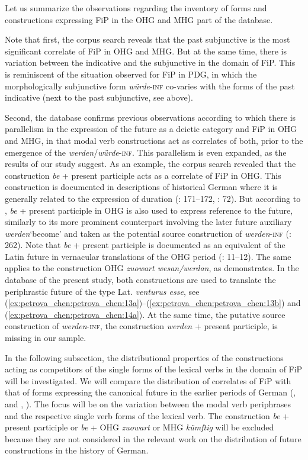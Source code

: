 \documentclass[output=paper,colorlinks,citecolor=brown]{langscibook}
\begin{document}
Let us summarize the observations regarding the inventory of forms and constructions expressing FiP in the OHG and MHG part of the database.

Note that first, the corpus search reveals that the past subjunctive is the most significant correlate of FiP in OHG and MHG. But at the same time, there is variation between the indicative and the subjunctive in the domain of FiP. This is reminiscent of the situation observed for FiP in PDG, in which the morphologically subjunctive form \textit{würde}-\textsc{inf} co-varies with the forms of the past indicative (next to the past subjunctive, see  above).

Second, the database confirms previous observations according to which there is parallelism in the expression of the future as a deictic category and FiP in OHG and MHG, in that modal verb constructions act as correlates of both, prior to the emergence of the \textit{werden}/\textit{würde}-\textsc{inf}. This parallelism is even expanded, as the results of our study suggest. As an example, the corpus search revealed that the construction \textit{be} + present participle acts as a correlate of FiP in OHG. This construction is documented in descriptions of historical German where it is generally related to the expression of duration (\cite{Wilmanns1906}: 171--172, \cite{Paul1968}: 72). But according to \citet[20]{rick1905}, \textit{be} + present participle in OHG is also used to express reference to the future, similarly to its more prominent counterpart involving the later future auxiliary \textit{werden}‘become’ and taken as the potential source construction of \textit{werden}-\textsc{inf} (\cite{Behaghel1924}: 262). Note that \textit{be} + present participle is documented as an equivalent of the Latin future in vernacular translations of the OHG period (\cite{Hinsdale1897}: 11–12). The same applies to the construction OHG \textit{zuowart wesan/werdan}, as \citet[11]{Hinsdale1897} demonstrates. In the database of the present study, both constructions are used to translate the periphrastic future of the type Lat. \textit{venturus esse}, see (\ref{ex:petrova_chen:petrova_chen:13a})–(\ref{ex:petrova_chen:petrova_chen:13b}) and (\ref{ex:petrova_chen:petrova_chen:14a}). At the same time, the putative source construction of \textit{werden}-\textsc{inf}, the construction \textit{werden} + present participle, is missing in our sample.

In the following subsection, the distributional properties of the constructions acting as competitors of the single forms of the lexical verbs in the domain of FiP will be investigated. We will compare the distribution of correlates of FiP with that of forms expressing the canonical future in the earlier periods of German (\cite{Behaghel1924}, \cite{Luther2012} and \citeyear{Luther2013}, \cite{Hartmann2021}). The focus will be on the variation between the modal verb periphrases and the respective single verb forms of the lexical verb. The construction \textit{be} + present participle or \textit{be} + OHG \textit{zuowart} or MHG \textit{kümftig} will be excluded because they are not considered in the relevant work on the distribution of future constructions in the history of German.
\end{document}
